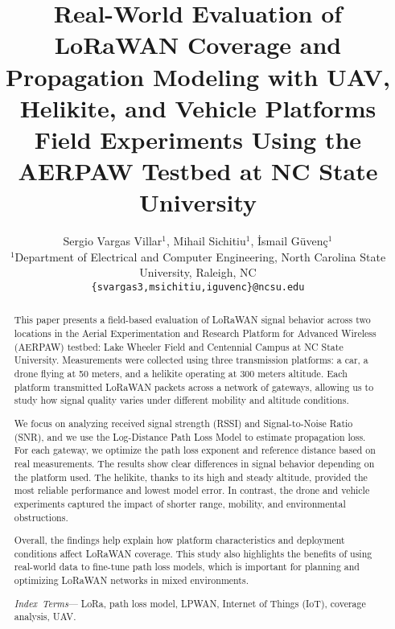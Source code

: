 \documentclass[journal]{IEEEtran}
\begin{document}
\renewcommand{\baselinestretch}{0.85}
\renewcommand{\arraystretch}{1.2}

\title{Real-World Evaluation of LoRaWAN Coverage and Propagation Modeling with UAV, Helikite, and Vehicle Platforms
\\
\large Field Experiments Using the AERPAW Testbed at NC State University}

\author{Sergio Vargas Villar$^1$, Mihail Sichitiu$^1$, \.{I}smail G\"{u}ven\c{c}$^1$\\
$^1$Department of Electrical and Computer Engineering, North Carolina State University, Raleigh, NC\\
{\tt \{svargas3,msichitiu,iguvenc\}@ncsu.edu}
}


\maketitle
\thispagestyle{empty}
\begin{abstract}
\pagestyle{empty}

This paper presents a field-based evaluation of LoRaWAN signal behavior across two locations in the Aerial Experimentation and Research Platform for Advanced Wireless (AERPAW) testbed: Lake Wheeler Field and Centennial Campus at NC State University. Measurements were collected using three transmission platforms: a car, a drone flying at 50 meters, and a helikite operating at 300 meters altitude. Each platform transmitted LoRaWAN packets across a network of gateways, allowing us to study how signal quality varies under different mobility and altitude conditions.

We focus on analyzing received signal strength (RSSI) and Signal-to-Noise Ratio (SNR), and we use the Log-Distance Path Loss Model to estimate propagation loss. For each gateway, we optimize the path loss exponent and reference distance based on real measurements. The results show clear differences in signal behavior depending on the platform used. The helikite, thanks to its high and steady altitude, provided the most reliable performance and lowest model error. In contrast, the drone and vehicle experiments captured the impact of shorter range, mobility, and environmental obstructions.

Overall, the findings help explain how platform characteristics and deployment conditions affect LoRaWAN coverage. This study also highlights the benefits of using real-world data to fine-tune path loss models, which is important for planning and optimizing LoRaWAN networks in mixed environments.


\pagestyle{empty}
\textit{Index~Terms}--- LoRa, path loss model, LPWAN, Internet of Things (IoT), coverage analysis, UAV.
\end{abstract}
\end{document}
